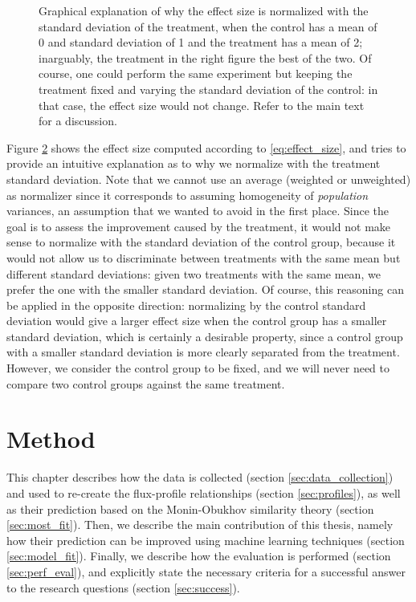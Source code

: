 \documentclass[a4paper]{book}
\begin{document}
\begin{figure}
\begin{subfigure}[t]{0.49\textwidth}
		\label{fig:large_es}
    \end{subfigure}
    \caption{Graphical explanation of why the effect size is normalized with the standard deviation of the treatment, when the control has a mean of 0 and standard deviation of 1 and the treatment has a mean of 2; inarguably, the treatment in the right figure the best of the two. Of course, one could perform the same experiment but keeping the treatment fixed and varying the standard deviation of the control: in that case, the effect size would not change. Refer to the main text for a discussion.}
	\label{fig:effect_size}
\end{figure}


Figure \ref{fig:effect_size} shows the effect size computed according to \ref{eq:effect_size}, and tries to provide an intuitive explanation as to why we normalize with the treatment standard deviation. Note that we cannot use an average (weighted or unweighted) as normalizer since it corresponds to assuming homogeneity of \emph{population} variances, an assumption that we wanted to avoid in the first place. Since the goal is to assess the improvement caused by the treatment, it would not make sense to normalize with the standard deviation of the control group, because it would not allow us to discriminate between treatments with the same mean but different standard deviations: given two treatments with the same mean, we prefer the one with the smaller standard deviation. Of course, this reasoning can be applied in the opposite direction: normalizing by the control standard deviation would give a larger effect size when the control group has a smaller standard deviation, which is certainly a desirable property, since a control group with a smaller standard deviation is more clearly separated from the treatment. However, we consider the control group to be fixed, and we will never need to compare two control groups against the same treatment.



\chapter{Method}
\label{ch:method}
This chapter describes how the data is collected (section \ref{sec:data_collection}) and used to re-create the flux-profile relationships (section \ref{sec:profiles}), as well as their prediction based on the Monin-Obukhov similarity theory (section \ref{sec:most_fit}). Then, we describe the main contribution of this thesis, namely how their prediction can be improved using machine learning techniques (section \ref{sec:model_fit}). Finally, we describe how the evaluation is performed (section \ref{sec:perf_eval}), and explicitly state the necessary criteria for a successful answer to the research questions (section  \ref{sec:success}).
\end{document}
